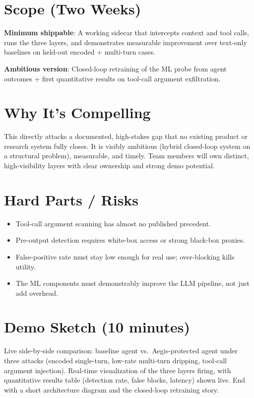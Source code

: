 \documentclass[11pt,letterpaper]{article}
\begin{document}
\section*{Scope (Two Weeks)}

\textbf{Minimum shippable}: A working sidecar that intercepts context and tool calls, runs the three layers, and demonstrates measurable improvement over text-only baselines on held-out encoded + multi-turn cases.

\textbf{Ambitious version}: Closed-loop retraining of the ML probe from agent outcomes + first quantitative results on tool-call argument exfiltration.

\section*{Why It's Compelling}

This directly attacks a documented, high-stakes gap that no existing product or research system fully closes. It is visibly ambitious (hybrid closed-loop system on a structural problem), measurable, and timely. Team members will own distinct, high-visibility layers with clear ownership and strong demo potential.

\section*{Hard Parts / Risks}

\begin{itemize}[leftmargin=1.2em]
    \item Tool-call argument scanning has almost no published precedent.
    \item Pre-output detection requires white-box access or strong black-box proxies.
    \item False-positive rate must stay low enough for real use; over-blocking kills utility.
    \item The ML components must demonstrably improve the LLM pipeline, not just add overhead.
\end{itemize}

\section*{Demo Sketch (10 minutes)}

Live side-by-side comparison: baseline agent vs.\ Aegis-protected agent under three attacks (encoded single-turn, low-rate multi-turn dripping, tool-call argument injection). Real-time visualization of the three layers firing, with quantitative results table (detection rate, false blocks, latency) shown live. End with a short architecture diagram and the closed-loop retraining story.
\end{document}
